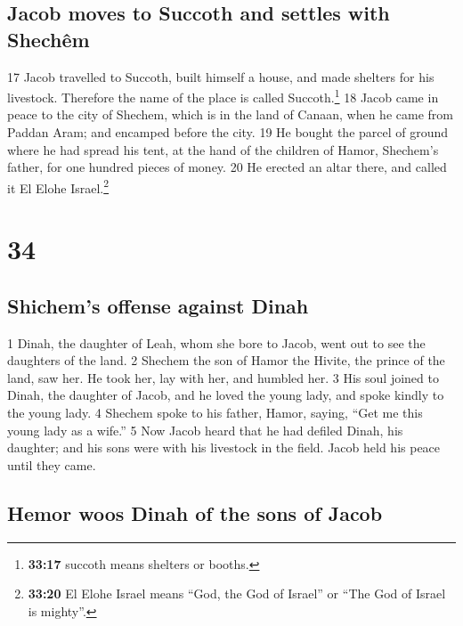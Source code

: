 \hypertarget{jacob-moves-to-succoth-and-settles-with-shechuxeam}{%
\subsection{Jacob moves to Succoth and settles with
Shechêm}\label{jacob-moves-to-succoth-and-settles-with-shechuxeam}}

{17} Jacob travelled to Succoth, built himself a house, and made
shelters for his livestock. Therefore the name of the place is called
Succoth.\footnote{\textbf{33:17} succoth means shelters or booths.} {18}
Jacob came in peace to the city of Shechem, which is in the land of
Canaan, when he came from Paddan Aram; and encamped before the city.
{19} He bought the parcel of ground where he had spread his tent, at the
hand of the children of Hamor, Shechem's father, for one hundred pieces
of money. {20} He erected an altar there, and called it El Elohe
Israel.\footnote{\textbf{33:20} El Elohe Israel means ``God, the God of
  Israel'' or ``The God of Israel is mighty''.}

\hypertarget{section-33}{%
\section{34}\label{section-33}}

\hypertarget{shichems-offense-against-dinah}{%
\subsection{Shichem's offense against
Dinah}\label{shichems-offense-against-dinah}}

{1} Dinah, the daughter of Leah, whom she bore to Jacob, went out to see
the daughters of the land. {2} Shechem the son of Hamor the Hivite, the
prince of the land, saw her. He took her, lay with her, and humbled her.
{3} His soul joined to Dinah, the daughter of Jacob, and he loved the
young lady, and spoke kindly to the young lady. {4} Shechem spoke to his
father, Hamor, saying, ``Get me this young lady as a wife.'' {5} Now
Jacob heard that he had defiled Dinah, his daughter; and his sons were
with his livestock in the field. Jacob held his peace until they came.

\hypertarget{hemor-woos-dinah-of-the-sons-of-jacob}{%
\subsection{Hemor woos Dinah of the sons of
Jacob}\label{hemor-woos-dinah-of-the-sons-of-jacob}}

